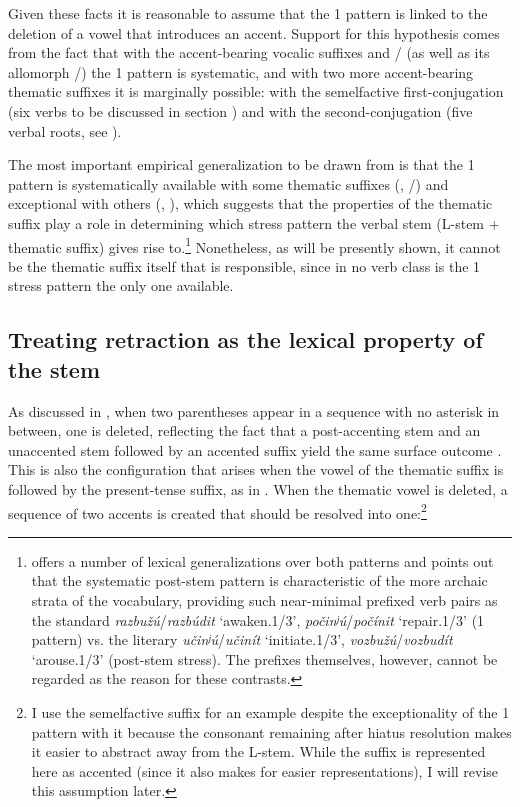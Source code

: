 \documentclass[output=paper,colorlinks,citecolor=black,koreanfont]{langscibook}
\begin{document}
Given these facts it is reasonable to assume that the {1\SG} pattern is linked to the deletion of a vowel that introduces an accent. Support for this hypothesis comes from the fact that with the accent-bearing vocalic suffixes  and / (as well as its allomorph /) the {1\SG} pattern is systematic, and with two more accent-bearing thematic suffixes it is marginally possible: with the semelfactive first-conjugation  (six verbs to be discussed in section ) and with the second-conjugation  (five verbal roots, see ).

The most important empirical generalization to be drawn from  is that the {1\SG} pattern is systematically available with some thematic suffixes (, /) and exceptional with others (, ), which suggests that the properties of the thematic suffix play a role in determining which stress pattern the verbal stem (L-stem + thematic suffix) gives rise to.\footnote{\citet[28, 380]{Zaliznjak1985} offers a number of lexical generalizations over both patterns and points out that the systematic post-stem pattern is characteristic of the more archaic strata of the vocabulary, providing such near-minimal prefixed verb pairs as the standard \textit{razbužú}/\textit{razbúdit} ‘awaken.{1\SG}/{3\SG}’, \textit{počinʲú}/\textit{počínit} ‘repair.{1\SG}/{3\SG}’ ({1\SG} pattern) vs. the literary \textit{učinʲú}/\textit{učinít} ‘initiate.{1\SG}/{3\SG}’, \textit{vozbužú}/\textit{vozbudít} ‘arouse.{1\SG}/{3\SG}’ (post-stem stress). The prefixes themselves, however, cannot be regarded as the reason for these contrasts.} Nonetheless, as will be presently shown, it cannot be the thematic suffix itself that is responsible, since in no verb class is the {1\SG} stress pattern the only one available.

\subsection{Treating retraction as the lexical property of the stem}
\largerpage
As discussed in , when two parentheses appear in a sequence with no asterisk in between, one is deleted, reflecting the fact that a post-accenting stem and an unaccented stem followed by an accented suffix yield the same surface outcome . This is also the configuration that arises when the vowel of the thematic suffix is followed by the present-tense suffix, as in . When the thematic vowel is deleted, a sequence of two accents is created that should be resolved into one:\footnote{I use the semelfactive suffix  for an example despite the exceptionality of the {1\SG} pattern with it because the consonant remaining after hiatus resolution makes it easier to abstract away from the L-stem. While the suffix is represented here as accented (since it also makes for easier representations), I will revise this assumption later.}\bigskip
\end{document}
